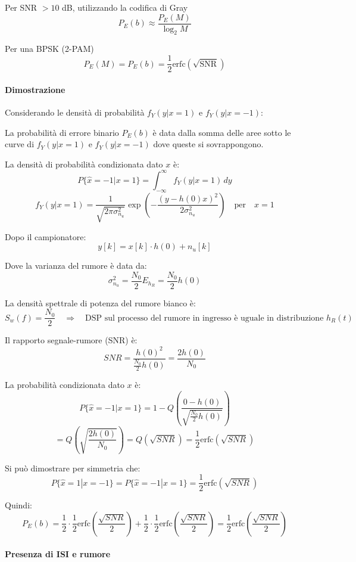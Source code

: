 Per SNR $> 10$ dB, utilizzando la codifica di Gray
\[
P_E(b) \approx \frac{P_E(M)}{\log_2 M}
\]

Per una BPSK (2-PAM)
\[
P_E(M) = P_E(b) = \frac{1}{2} \text{erfc}\left(\sqrt{\text{SNR}}\right)
\]

\paragraph{Dimostrazione}

Considerando le densità di probabilità $f_Y(y|x=1)$ e $f_Y(y|x=-1)$:

La probabilità di errore binario $P_E(b)$ è data dalla somma delle aree sotto le curve di $f_Y(y|x=1)$ e $f_Y(y|x=-1)$ dove queste si sovrappongono.



La densità di probabilità condizionata dato $x$ è:
\[
P\{ \hat{x} = -1 | x = 1 \} = \int_{-\infty}^{\infty} f_Y(y | x = 1) \, dy
\]
\[
f_Y(y | x = 1) = \frac{1}{\sqrt{2\pi \sigma_{n_u}^2}} \exp \left( -\frac{(y - h(0)x)^2}{2\sigma_{n_u}^2} \right) \quad \text{per} \quad x = 1
\]

Dopo il campionatore:
\[
y[k] = x[k]\cdot h(0) + n_u[k]
\]

Dove la varianza del rumore è data da:
\[
\sigma_{n_u}^2 = \frac{N_0}{2} E_{h_R} = \frac{N_0}{2} h(0)
\]

La densità spettrale di potenza del rumore bianco è:
\[
S_w(f) = \frac{N_0}{2} \quad \Rightarrow \quad \text{DSP sul processo del rumore in ingresso è uguale in distribuzione } h_R(t)
\]

Il rapporto segnale-rumore (SNR) è:
\[
SNR = \frac{h(0)^2}{\frac{N_0}{2} h(0)} = \frac{2 h(0)}{N_0}
\]

La probabilità condizionata dato $x$ è:
\[
P\{ \hat{x} = -1 | x = 1 \} = 1 - Q\left( \frac{0 - h(0)}{\sqrt{\frac{N_0}{2} h(0)}} \right)
\]
\[
= Q\left( \sqrt{\frac{2 h(0)}{N_0}} \right) = Q\left( \sqrt{SNR} \right) = \frac{1}{2} \text{erfc}\left( \sqrt{SNR} \right)
\]

Si può dimostrare per simmetria che:
\[
P\{ \hat{x} = 1 | x = -1 \} = P\{ \hat{x} = -1 | x = 1 \} = \frac{1}{2} \text{erfc}\left( \sqrt{SNR} \right)
\]


Quindi:
\[
P_E(b) = \frac{1}{2} \cdot \frac{1}{2} \text{erfc}\left( \frac{\sqrt{SNR}}{2} \right) + \frac{1}{2} \cdot \frac{1}{2} \text{erfc}\left( \frac{\sqrt{SNR}}{2} \right) = \frac{1}{2} \text{erfc}\left( \frac{\sqrt{SNR}}{2} \right)
\]

\paragraph{Presenza di ISI e rumore}

